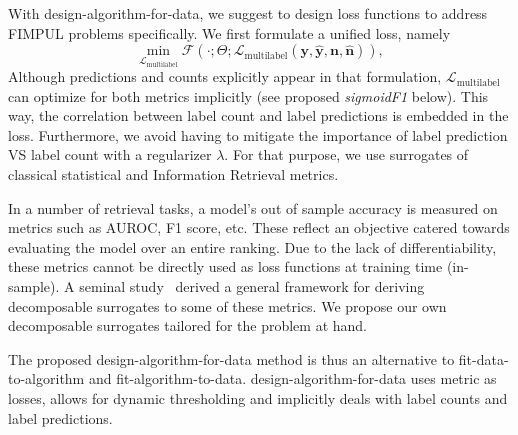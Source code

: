 With design-algorithm-for-data, we suggest to design loss functions to address FIMPUL problems specifically. We first formulate a unified loss, namely
%
\begin{equation}
\underset{\mathcal{L}_{\text {multilabel}}} {\min} \mathcal{F}\left(\cdot ;
\Theta; \mathcal{L}_{\text {multilabel}} (\mathbf{y}, \hat{\mathbf{y}},
\mathbf{n}, \hat{\mathbf{n}}) \right),
\end{equation}
%
Although predictions and counts explicitly appear in that formulation,
\(\mathcal{L}_{\text {multilabel}}\) can optimize for both metrics implicitly
(see proposed \emph{sigmoidF1} below). This way, the correlation between label count and label predictions is embedded in the loss. Furthermore, we avoid having to mitigate the importance of label prediction VS label count with a regularizer  $\lambda$. For that purpose, we use surrogates of classical statistical and Information Retrieval metrics.

In a number of retrieval tasks, a model's out of sample accuracy is measured
on metrics such as AUROC, F1 score, etc. These reflect an objective catered
towards evaluating the model over an entire ranking. Due to the lack of
differentiability, these metrics cannot be directly used as loss functions at
training time (in-sample). A seminal study~\cite{optimizableLosses} derived a
general framework for deriving decomposable surrogates to some of these
metrics. We propose our own decomposable surrogates tailored for the problem
at hand.

The proposed design-algorithm-for-data method is thus an alternative to fit-data-to-algorithm and fit-algorithm-to-data. design-algorithm-for-data uses metric as losses, allows for dynamic thresholding and implicitly deals with label counts and label predictions.


